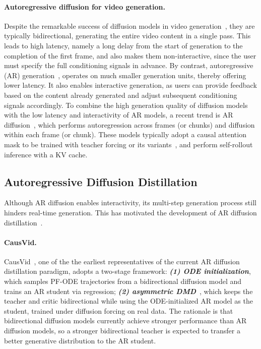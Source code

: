 \paragraph{Autoregressive diffusion for video generation.}
Despite the remarkable success of diffusion models in video generation~\cite{videoworldsimulators2024,lin2024open,zheng2024open,yang2024cogvideox,wan2025wan,kong2024hunyuanvideo,bao2024vidu,li2025radial}, they are typically bidirectional, generating the entire video content in a single pass. This leads to high latency, namely a long delay from the start of generation to the completion of the first frame, and also makes them non-interactive, since the user must specify the full conditioning signals in advance. By contrast, autoregressive (AR) generation~\cite{wu2021godiva,hong2022cogvideo,wu2022nuwa,weissenborn2019scaling,yan2021videogpt,zhao2025ultraimage,zhao2025riflex,deng2024autoregressive,kondratyuk2023videopoet}, operates on much smaller generation units, thereby offering lower latency. It also enables interactive generation, as users can provide feedback based on the content already generated and adjust subsequent conditioning signals accordingly. To combine the high generation quality of diffusion models with the low latency and interactivity of AR models, a recent trend is AR diffusion~\cite{jin2024pyramidal,teng2025magi,chen2025skyreels}, which performs autoregression across frames (or chunks) and diffusion within each frame (or chunk). These models typically adopt a causal attention mask to be trained with teacher forcing or its variants~\cite{teng2025magi, chen2024diffusion, wu2025pack, guo2025end, po2025bagger}, and perform self-rollout inference with a KV cache.


\subsection{Autoregressive Diffusion Distillation}
\label{sec:bg-distillation}
Although AR diffusion enables interactivity, its multi-step generation process still hinders real-time generation. This has motivated the development of AR diffusion distillation~\cite{lin2025autoregressive,lin2025diffusion,yang2025towards,lu2025reward,wang2026worldcompass,yang2025longlive,liu2025rolling,cui2025self,sun2025worldplay}.

\paragraph{CausVid.}
CausVid~\cite{yin2025slow}, one of the the earliest representatives of the current AR diffusion distillation paradigm, adopts a two-stage framework:
\emph{\textbf{(1) ODE initialization}}, which samples PF-ODE trajectories from a bidirectional diffusion model and trains an AR student via regression;
\emph{\textbf{(2) asymmetric DMD}}~\cite{wang2023prolificdreamer,luo2023diff,yin2024one}, which keeps the teacher and critic bidirectional while using the ODE-initialized AR model as the student, trained under diffusion forcing on real data.
The rationale is that bidirectional diffusion models currently achieve stronger performance than AR diffusion models, so a stronger bidirectional teacher is expected to transfer a better generative distribution to the AR student.

